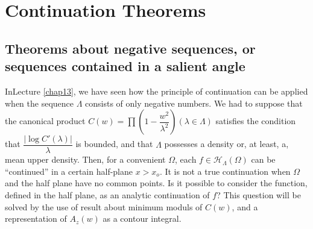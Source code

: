 \chapter{Continuation Theorems}\label{chap15} %

\section[Theorems about negative sequences,...]{Theorems about negative sequences, or sequences
  contained in a salient angle}\label{chap15:sec1} %

In\pageoriginale Lecture \ref{chap13}, we have seen how the principle of continuation can be
applied when the sequence $\Lambda$ consists of only negative
numbers. We had to suppose that the canonical product $C(w) = \prod
(1-\dfrac{w^2} {\lambda^2}) (\lambda \in \Lambda)$ satisfies
the condition that $\dfrac{|\log C' (\lambda)|} {\lambda}$ is bounded,
and that $\Lambda$ possesses a density or, at least, a, mean upper
density. Then, for a convenient $\Omega$, each $f \in 
\mathscr{H}_\Lambda (\Omega)$ can be ``continued'' in a certain
half-plane $x > x_o$. It is not a true continuation when $\Omega$ and
the half plane have no common points. Is it possible to consider the
function, defined in the half plane, as an analytic continuation of
$f$? This question will be solved by the use of result about minimum
moduls of $C(w)$, and a representation of $A_z (w)$ as a contour
integral. 

